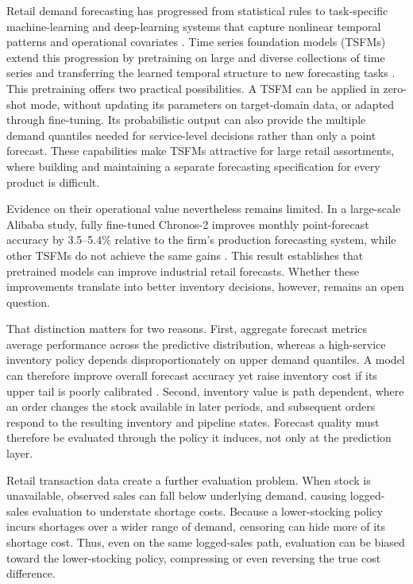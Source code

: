 \documentclass[msom,dblanonrev]{informs4}
\begin{document}
Retail demand forecasting has progressed from statistical rules to task-specific machine-learning and deep-learning systems that capture nonlinear temporal patterns and operational covariates \citep{PetropoulosEtAl2022,Salinas2020DeepAR,LimEtAl2021}. Time series foundation models (TSFMs) extend this progression by pretraining on large and diverse collections of time series and transferring the learned temporal structure to new forecasting tasks \citep{Ansari2024Chronos,LagLlama2024,TimesFM2024}.
This pretraining offers two practical possibilities. A TSFM can be applied in zero-shot mode, without updating its parameters on target-domain data, or adapted through fine-tuning. Its probabilistic output can also provide the multiple demand quantiles needed for service-level decisions rather than only a point forecast. These capabilities make TSFMs attractive for large retail assortments, where building and maintaining a separate forecasting specification for every product is difficult.

Evidence on their operational value nevertheless remains limited. In a large-scale Alibaba study, fully fine-tuned Chronos-2 \citep{Ansari2025Chronos2} improves monthly point-forecast accuracy by 3.5--5.4\% relative to the firm's production forecasting system, while other TSFMs do not achieve the same gains \citep{SuiEtAl2026}. This result establishes that pretrained models can improve industrial retail forecasts. Whether these improvements translate into better inventory decisions, however, remains an open question.

That distinction matters for two reasons. First, aggregate forecast metrics average performance across the predictive distribution, whereas a high-service inventory policy depends disproportionately on upper demand quantiles. A model can therefore improve overall forecast accuracy yet raise inventory cost if its upper tail is poorly calibrated \citep{Syntetos2009}. Second, inventory value is path dependent, where an order changes the stock available in later periods, and subsequent orders respond to the resulting inventory and pipeline states. Forecast quality must therefore be evaluated through the policy it induces, not only at the prediction layer.

Retail transaction data create a further evaluation problem. When stock is unavailable, observed sales can fall below underlying demand, causing logged-sales evaluation to understate shortage costs. Because a lower-stocking policy incurs shortages over a wider range of demand, censoring can hide more of its shortage cost. Thus, even on the same logged-sales path, evaluation can be biased toward the lower-stocking policy, compressing or even reversing the true cost difference.
\end{document}
